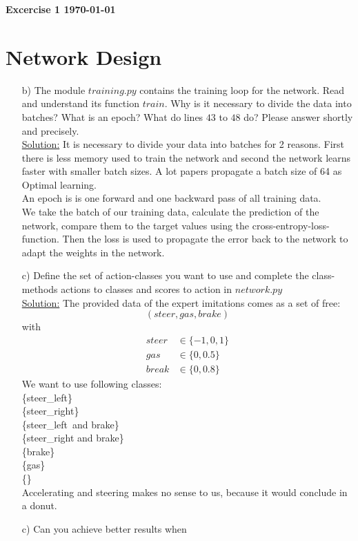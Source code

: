 \documentclass[DIN, pagenumber=false, fontsize=11pt, parskip=half]{scrartcl}
\newcommand{\mytitle}[1]{{\noindent\textbf{#1}}}
\newcommand{\sol}{\underline{Solution:} }
\begin{document}
\mytitle{{\huge Excercise 1} \hfill \today}
\section{Network Design }
\begin{enumerate}[b)]
	\item[b)]The module $training.py$ contains the training loop for the network. Read and understand its
	function $train$. Why is it necessary to divide the data into batches? What is an epoch? What do
	lines $43$ to $48$ do? Please answer shortly and precisely.\\
	\sol It is necessary to divide your data into batches for 2 reasons. First there is less memory used to train the network and second the network learns faster with smaller batch sizes. A lot papers propagate a batch size of 64 as Optimal learning.\\
	An epoch is is one forward and one backward pass of all training data.\\
	We take the batch of our training data, calculate the prediction of the network, compare them to the target values using the cross-entropy-loss-function. Then the loss is used to propagate the error back to the network to adapt the weights in the network. 
	\item[c)] Define the set of action-classes you want to use and complete the class-methods actions to classes
	and scores to action in $network.py$\\
	\sol The provided data of the expert imitations comes as a set of free:
	\[(steer,gas,brake)\]
	with
	\begin{align*}
		steer&\in\{-1,0,1\}\\
		gas&\in \{0,0.5\}\\
		break&\in \{0,0.8\}
	\end{align*}
	We want to use following classes:\\ 
		\{steer\_left\}\\
		\{steer\_right\}\\
		\{steer\_left\ and brake\}\\
		\{steer\_right and brake\}\\		
		\{brake\}\\
		\{gas\}\\
		\{\}\\
		Accelerating and steering makes no sense to us, because it would conclude in a donut. 
	\item[c)] Can you achieve better results when

\end{enumerate}
\end{document}
